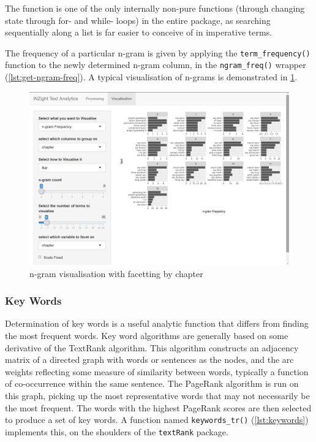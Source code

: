 \documentclass[11pt, a4paper, titlepage]{report}
\begin{document}
The function is one of the only internally non-pure functions (through
changing state through for- and while- loops) in the entire package,
as searching sequentially along a list is far easier to conceive of in
imperative terms.

The frequency of a particular n-gram is given by applying the
\texttt{term_frequency()} function to the newly determined
n-gram column, in the \texttt{ngram_freq()} wrapper
(\underline{\cref{lst:get-ngram-freq}}). A typical
visualisation of n-grams is demonstrated in
\cref{fig:visualisation-n-gram-facet}.

\begin{figure}
  \centering
  \includegraphics[scale=0.35]{visualisation-n-gram-facet.png}
  \caption{n-gram visualisation with facetting by
    chapter\label{fig:visualisation-n-gram-facet}}
\end{figure}

\subsubsection{Key Words}\label{sec:key-words}

Determination of key words is a useful analytic function that differs
from finding the most frequent words. Key word algorithms are
generally based on some derivative of the TextRank algorithm. This
algorithm constructs an adjacency matrix of a directed graph with
words or sentences as the nodes, and the arc weights reflecting some
measure of similarity between words, typically a function of
co-occurrence within the same sentence. The PageRank algorithm is run
on this graph, picking up the most representative words that may not
necessarily be the most frequent. The words with the highest PageRank
scores are then selected to produce a set of key words. A function
named \texttt{keywords_tr()} (\underline{\cref{lst:keywords}})
implements this, on the shoulders of the \texttt{textRank}
package\autocite{wijffels19}.
\end{document}
